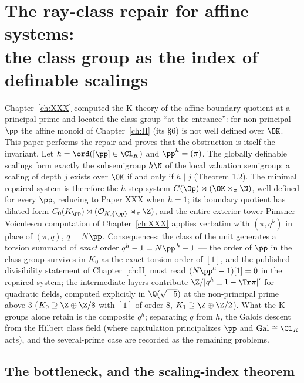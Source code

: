 \chapter[The ray-class repair for affine systems]{The ray-class repair for affine systems:\\ the class group as the index of definable scalings}\label{ch:XXXI}
\renewcommand{\Ns}{N}
\begin{summary}
Chapter~\ref{ch:XXX} computed the K-theory of the affine boundary quotient at a principal prime and
located the class group ``at the entrance'': for non-principal $\pp$ the affine monoid of
Chapter~\ref{ch:II} (its \S6) is not well defined over $\OK$. This paper performs the repair and
proves that the obstruction is itself the invariant. Let $h=\ord([\pp]\in\Cl_K)$ and
$\pp^h=(\pi)$. The globally definable scalings form exactly the subsemigroup
$h\N$ of the local valuation semigroup: a scaling of depth $j$ exists over $\OK$ if and
only if $h\mid j$ (Theorem 1.2). The minimal repaired system is therefore the $h$-step
system $C(\Op)\rtimes(\OK\rtimes_\pi\N)$, well defined for every $\pp$, reducing to Paper
XXX when $h=1$; its boundary quotient has dilated form
$C_0(K_\pp)\rtimes(\mathcal O_{K,\{\pp\}}\rtimes_\pi\Z)$, and the entire exterior-tower
Pimsner--Voiculescu computation of Chapter~\ref{ch:XXX} applies verbatim with $(\pi,q^h)$ in place of
$(\pi,q)$, $q=\Ns\pp$. Consequences: the class of the unit generates a torsion summand of
\emph{exact} order $q^h-1=\Ns\pp^{\,h}-1$ --- the order of $\pp$ in the class group
survives in $K_0$ as the exact torsion order of $[1]$, and the published divisibility
statement of Chapter~\ref{ch:II} must read $(\Ns\pp^{h}-1)[1]=0$ in the repaired system; the
intermediate layers contribute $\Z/|q^h\pm1-\Tr\pi|'$ for quadratic fields, computed
explicitly in $\Q(\sqrt{-5})$ at the non-principal prime above $3$ ($K_0\supseteq
\Z\oplus\Z/8$ with $[1]$ of order $8$, $K_1\supseteq\Z\oplus\Z/2$). What the K-groups
alone retain is the composite $q^h$; separating $q$ from $h$, the Galois descent from the
Hilbert class field (where capitulation principalizes $\pp$ and $\mathrm{Gal}\cong\Cl_K$
acts), and the several-prime case are recorded as the remaining problems.
\end{summary}


\section{The bottleneck, and the scaling-index theorem}\label{XXXI:sec:index}

